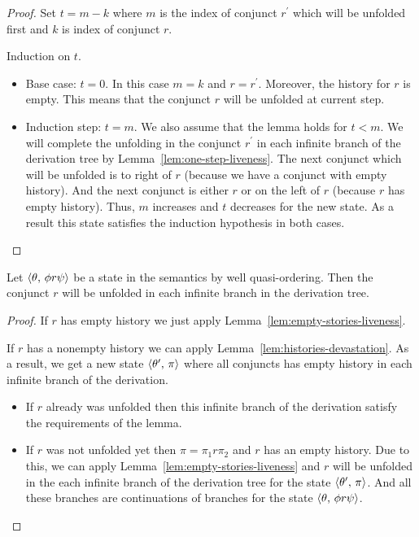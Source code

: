 \begin{proof}
 Set $t = m - k$ where $m$ is the index of conjunct $r^\prime$ which will be unfolded first and $k$ is index of conjunct $r$.

Induction on $t$.

\begin{itemize}
    \item Base case: $t = 0$. In this case $m = k$ and $r = r^\prime$. Moreover, the history for $r$ is empty. This means that the conjunct $r$ will
    be unfolded at current step.
    \item Induction step: $t = m$. We also assume that the lemma holds for $t < m$.
    We will complete the unfolding in the conjunct $r^\prime$ in each infinite branch of the derivation tree by Lemma~\ref{lem:one-step-liveness}.
    The next conjunct which will be unfolded is to right of $r$ (because we have a conjunct with empty history). And the next conjunct is either $r$ or
    on the left of $r$ (because $r$ has empty history). Thus, $m$ increases and $t$ decreases for the new state. As a result this state satisfies
    the induction hypothesis in both cases.
\end{itemize}
\end{proof}

\begin{lemma}
  \label{lem:liveness}
Let $\langle \theta,\, \phi r \psi \rangle$ be a state in the semantics by well quasi-ordering. Then the conjunct $r$ will be unfolded in each infinite branch in the derivation tree.
\end{lemma}
\begin{proof}
If $r$ has empty history we just apply Lemma~\ref{lem:empty-stories-liveness}.

If $r$ has a nonempty history we can apply Lemma~\ref{lem:histories-devastation}. As a result, we get a new state $\langle \theta^\prime,\, \pi \rangle$ where all conjuncts
has empty history in each infinite branch of the derivation.

\begin{itemize}
    \item If $r$ already was unfolded then this infinite branch of the derivation satisfy the requirements of the lemma.
    \item If $r$ was not unfolded yet then $\pi = \pi_1 r \pi_2$ and $r$ has an empty history. Due to this, we can apply 
    Lemma~\ref{lem:empty-stories-liveness} and $r$ will be unfolded in the each infinite branch of the derivation tree for the state $\langle \theta^\prime,\, \pi \rangle$.
    And all these branches are continuations of branches for the state $\langle \theta,\, \phi r \psi \rangle$.
\end{itemize}
\end{proof}

